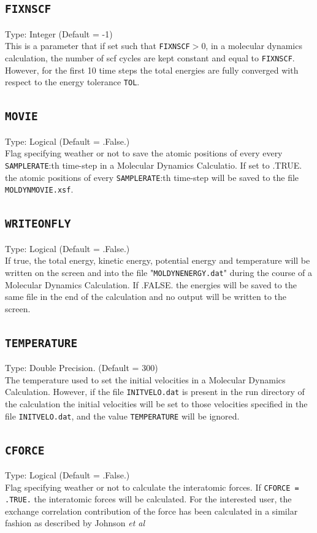 \documentclass[a4paper,twoside,openany]{book}
\begin{document}
 \subsection{\texttt{FIXNSCF}}
 Type: Integer (Default = -1)\\
 This is a parameter that if set such that \texttt{FIXNSCF}$>$0, in a molecular dynamics calculation,  the number of scf cycles are kept constant and equal to \texttt{FIXNSCF}.
 However, for the first 10 time steps the total energies are fully converged with respect to the energy tolerance \texttt{TOL}.
 
 \subsection{\texttt{MOVIE}}
Type: Logical (Default = .False.)\\
Flag specifying weather or not to save the atomic positions of every every \texttt{SAMPLERATE}:th time-step in a Molecular Dynamics Calculatio. If set to .TRUE. 
the atomic positions of every  \texttt{SAMPLERATE}:th time-step will be saved to the file \texttt{MOLDYNMOVIE.xsf}.

 \subsection{\texttt{WRITEONFLY}}
Type: Logical (Default = .False.)\\
If true, the total energy, kinetic energy, potential energy and temperature will be written on the screen and into the file "\texttt{MOLDYNENERGY.dat}" during the 
course of a Molecular Dynamics Calculation. If .FALSE. the energies will be saved to the same file in the end of the calculation and no output will be written to 
the screen.

\subsection{\texttt{TEMPERATURE}}
Type: Double Precision. (Default = 300)\\
The temperature used to set the initial velocities in a Molecular Dynamics Calculation. However, if the file \texttt{INITVELO.dat} is present in 
the run directory of the calculation the initial velocities will be set to those velocities specified in the file  \texttt{INITVELO.dat}, and the value 
\texttt{TEMPERATURE} will be ignored.

 \subsection{\texttt{CFORCE}}
Type: Logical (Default = .False.)\\
Flag specifying weather or not to calculate the interatomic forces. If \texttt{CFORCE = .TRUE.} the interatomic forces will be calculated. 
For the interested user, the exchange correlation contribution of the force has been calculated in a similar fashion as described by Johnson {\it et al} \cite{xcforce}
\end{document}
